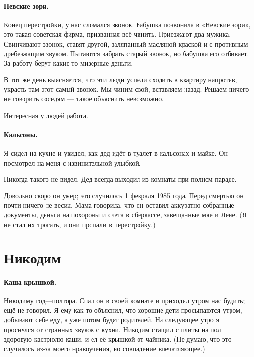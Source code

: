 \documentclass{book}
\begin{document}
\paragraph{Невские зори.}
Конец перестройки, у нас сломался звонок.
Бабушка позвонила в «Невские зори», это такая советская фирма, призванная всё чинить.
Приезжают два мужика.
Свинчивают звонок, ставят другой, заляпанный масляной краской и с противным дребезжащим звуком.
Пытаются забрать старый звонок, но бабушка его отбивает.
За работу берут какие-то мизерные деньги.

В тот же день выясняется, что эти люди успели сходить в квартиру напротив, украсть там этот самый звонок.
Мы чиним свой, вставляем назад.
Решаем ничего не говорить соседям --- такое объяснить невозможно.

Интересная у людей работа.

\paragraph{Кальсоны.}
Я сидел на кухне и увидел, как дед идёт в туалет в кальсонах и майке.
Он посмотрел на меня с извинительной улыбкой.

Никогда такого не видел.
Дед всегда выходил из комнаты при полном параде.

Довольно скоро он умер; это случилось 1 февраля 1985 года. 
Перед смертью он почти ничего не весил.
Мама говорила, что он оставил аккуратно собранные документы, деньги на похороны и  счета в сберкассе, завещанные мне и Лене.
(Я не стал их трогать, и они пропали в перестройку.)



\section*{Никодим}

\paragraph{Каша крышкой.}
Никодиму год---полтора.
Спал он в своей комнате и приходил утром нас будить; ещё не говорил.
Я ему как-то объяснил, что хорошие дети просыпаются утром, добывают себе еду, а уже потом будят родителей.
На следующее утро я проснулся от странных звуков с кухни.
Никодим стащил с плиты на пол здоровую кастрюлю каши, и ел её крышкой от чайника.
(Не думаю, что это случилось из-за моего нравоучения, но совпадение впечатляющее.)
\end{document}
